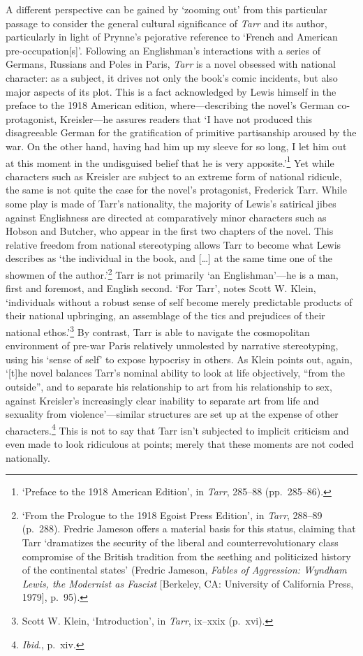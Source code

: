 \documentclass[]{article}
\begin{document}
A different perspective can be gained by ‘zooming out’ from this
particular passage to consider the general cultural significance of
\emph{Tarr} and its author, particularly in light of Prynne’s pejorative
reference to ‘French and American pre-occupation{[}s{]}’. Following an
Englishman’s interactions with a series of Germans, Russians and Poles
in Paris, \emph{Tarr} is a novel obsessed with national character: as a
subject, it drives not only the book’s comic incidents, but also major
aspects of its plot. This is a fact acknowledged by Lewis himself in the
preface to the 1918 American edition, where—describing the novel’s
German co-protagonist, Kreisler—he assures readers that ‘I have not
produced this disagreeable German for the gratification of primitive
partisanship aroused by the war. On the other hand, having had him up my
sleeve for so long, I let him out at this moment in the undisguised
belief that he is very apposite.’\footnote{‘Preface to the 1918 American
  Edition’, in \emph{Tarr}, 285–88 (pp.~285–86).} Yet while characters
such as Kreisler are subject to an extreme form of national ridicule,
the same is not quite the case for the novel’s protagonist, Frederick
Tarr. While some play is made of Tarr’s nationality, the majority of
Lewis’s satirical jibes against Englishness are directed at
comparatively minor characters such as Hobson and Butcher, who appear in
the first two chapters of the novel. This relative freedom from national
stereotyping allows Tarr to become what Lewis describes as ‘the
individual in the book, and {[}\ldots{}{]} at the same time one of the
showmen of the author.’\footnote{‘From the Prologue to the 1918 Egoist
  Press Edition’, in \emph{Tarr}, 288–89 (p.~288). Fredric Jameson
  offers a material basis for this status, claiming that Tarr
  ‘dramatizes the security of the liberal and counterrevolutionary class
  compromise of the British tradition from the seething and politicized
  history of the continental states’ (Fredric Jameson, \emph{Fables of
  Aggression: Wyndham Lewis, the Modernist as Fascist} {[}Berkeley, CA:
  University of California Press, 1979{]}, p.~95).} Tarr is not
primarily ‘an Englishman’—he is a man, first and foremost, and English
second. ‘For Tarr’, notes Scott W. Klein, ‘individuals without a robust
sense of self become merely predictable products of their national
upbringing, an assemblage of the tics and prejudices of their national
ethos.’\footnote{Scott W. Klein, ‘Introduction’, in \emph{Tarr}, ix–xxix
  (p.~xvi).} By contrast, Tarr is able to navigate the cosmopolitan
environment of pre-war Paris relatively unmolested by narrative
stereotyping, using his ‘sense of self’ to expose hypocrisy in others.
As Klein points out, again, ‘{[}t{]}he novel balances Tarr’s nominal
ability to look at life objectively, “from the outside”, and to separate
his relationship to art from his relationship to sex, against Kreisler’s
increasingly clear inability to separate art from life and sexuality
from violence’—similar structures are set up at the expense of other
characters.\footnote{\emph{Ibid}., p.~xiv.} This is not to say that Tarr
isn’t subjected to implicit criticism and even made to look ridiculous
at points; merely that these moments are not coded nationally.
\end{document}
